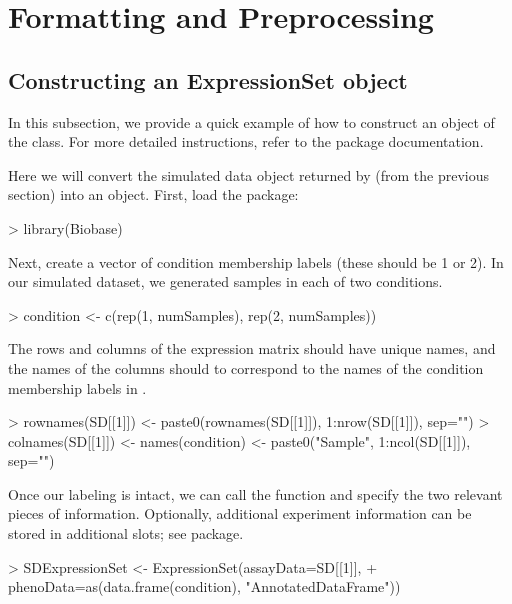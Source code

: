 \documentclass{article}
\begin{document}
\section{Formatting and Preprocessing}
\subsection{Constructing an ExpressionSet object}

In this subsection, we provide a quick example of how to construct an object of the  class.  For more detailed instructions, refer to the  package documentation.

Here we will convert the simulated data object  returned by  (from the previous section) into an  object. First, load the  package:

\begin{Schunk}
\begin{Sinput}
> library(Biobase)   
\end{Sinput}
\end{Schunk}

Next, create a vector of condition membership labels (these should be 1 or 2).  In our simulated dataset, we generated  samples in each of two conditions.

\begin{Schunk}
\begin{Sinput}
> condition <- c(rep(1, numSamples), rep(2, numSamples))
\end{Sinput}
\end{Schunk}

The rows and columns of the expression matrix should have unique names, and the names of the columns should to correspond to the names of the condition membership labels in .

\begin{Schunk}
\begin{Sinput}
> rownames(SD[[1]]) <- paste0(rownames(SD[[1]]), 1:nrow(SD[[1]]), sep="")
> colnames(SD[[1]]) <- names(condition) <- paste0("Sample", 1:ncol(SD[[1]]), sep="")
\end{Sinput}
\end{Schunk}

Once our labeling is intact, we can call the  function and specify the two relevant pieces of information.  Optionally, additional experiment information can be stored in additional slots; see  package.
\begin{Schunk}
\begin{Sinput}
> SDExpressionSet <- ExpressionSet(assayData=SD[[1]], 
+                     phenoData=as(data.frame(condition), "AnnotatedDataFrame"))
\end{Sinput}
\end{Schunk}
\end{document}
